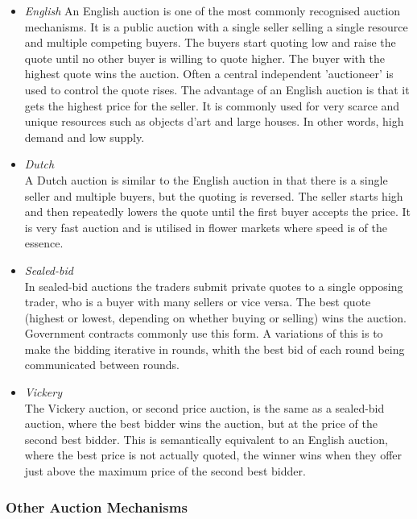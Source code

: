 \begin{itemize}

  \item \emph{English} An English auction is one of the most commonly
    recognised auction mechanisms.  It is a public auction with a single seller
    selling a single resource and multiple competing buyers. The buyers start
    quoting low and raise the quote until no other buyer is willing to quote
    higher. The buyer with the highest quote wins the auction.  Often a central
    independent 'auctioneer' is used to control the quote rises. The advantage
    of an English auction is that it gets the highest price for the seller. It
    is commonly used for very scarce and unique resources such as objects d'art
    and large houses. In other words, high demand and low supply.

  \item \emph{Dutch}\\
    A Dutch auction is similar to the English auction in that there is a single
    seller and multiple buyers, but the quoting is reversed. The seller starts high
    and then repeatedly lowers the quote until the first buyer accepts the price.
    It is very fast auction and is utilised in flower markets where speed is of the
    essence.

  \item \emph{Sealed-bid}\\
    In sealed-bid auctions the traders submit private
    quotes to a single opposing trader, who is a buyer with many sellers or
    vice versa. The best quote (highest or lowest, depending on whether buying
    or selling) wins the auction. Government contracts commonly use this form.
    A variations of this is to make the bidding iterative in rounds, whith the
    best bid of each round being communicated between rounds. 

  \item \emph{Vickery}\\
    The Vickery auction, or second price auction, is the same as a
    sealed-bid auction, where the best bidder wins the auction, but at the
    price of the second best bidder. This is semantically equivalent to an English
    auction, where the best price is not actually quoted, the winner wins when
    they offer just above the maximum price of the second best bidder.

\end{itemize}

\subsubsection{Other Auction Mechanisms}

